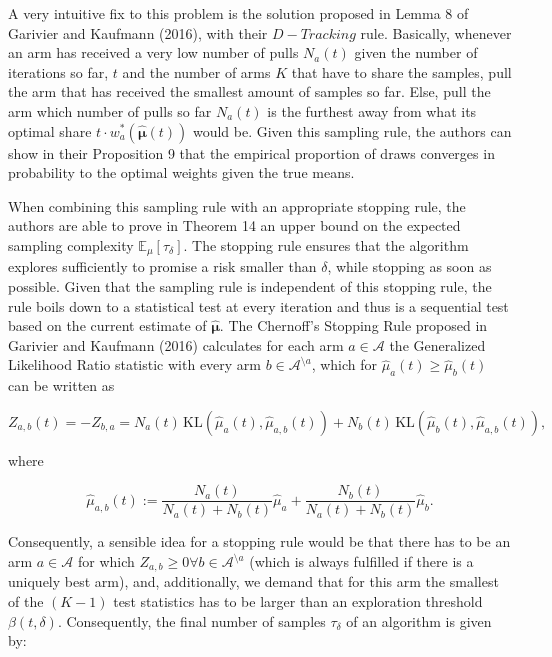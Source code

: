 \documentclass[12pt,]{article}
\newcommand{\KL}{\,\text{KL}}
\begin{document}
A very intuitive fix to this problem is the solution proposed in Lemma 8
of Garivier and Kaufmann (2016), with their \(D-Tracking\) rule.
Basically, whenever an arm has received a very low number of pulls
\(N_a(t)\) given the number of iterations so far, \(t\) and the number
of arms \(K\) that have to share the samples, pull the arm that has
received the smallest amount of samples so far. Else, pull the arm which
number of pulls so far \(N_a(t)\) is the furthest away from what its
optimal share \(t\cdot w^*_a(\hat{\bm{\mu}}(t))\) would be. Given this
sampling rule, the authors can show in their Proposition 9 that the
empirical proportion of draws converges in probability to the optimal
weights given the true means.

When combining this sampling rule with an appropriate stopping rule, the
authors are able to prove in Theorem 14 an upper bound on the expected
sampling complexity \(\mathbb{E}_{\mu}[\tau_{\delta}]\). The stopping
rule ensures that the algorithm explores sufficiently to promise a risk
smaller than \(\delta\), while stopping as soon as possible. Given that
the sampling rule is independent of this stopping rule, the rule boils
down to a statistical test at every iteration and thus is a sequential
test based on the current estimate of \(\hat{\bm{\mu}}\). The Chernoff's
Stopping Rule proposed in Garivier and Kaufmann (2016) calculates for
each arm \(a\in \mathcal{A}\) the Generalized Likelihood Ratio statistic
with every arm \(b \in \mathcal{A}^{\setminus a}\), which for
\(\hat{\mu}_a(t) \geq \hat{\mu}_b(t)\) can be written as

\begin{equation*}
Z_{a,b}(t) = - Z_{b,a} = N_a(t) \KL(\hat{\mu}_a(t),\hat{\mu}_{a,b}(t)) + N_b(t) \KL(\hat{\mu}_{b}(t), \hat{\mu}_{a,b}(t)),
\end{equation*}

where

\begin{equation*}
\hat{\mu}_{a,b}(t) := \frac{N_a(t)}{N_a(t) + N_b(t)}\hat{\mu}_a + \frac{N_b(t)}{N_a(t) + N_b(t)}\hat{\mu}_b.
\end{equation*}

Consequently, a sensible idea for a stopping rule would be that there
has to be an arm \(a \in \mathcal{A}\) for which
\(Z_{a,b} \geq 0 \forall b \in \mathcal{A}^{\setminus a}\) (which is
always fulfilled if there is a uniquely best arm), and, additionally, we
demand that for this arm the smallest of the \((K-1)\) test statistics
has to be larger than an exploration threshold \(\beta(t, \delta)\).
Consequently, the final number of samples \(\tau_{\delta}\) of an
algorithm is given by:
\end{document}
